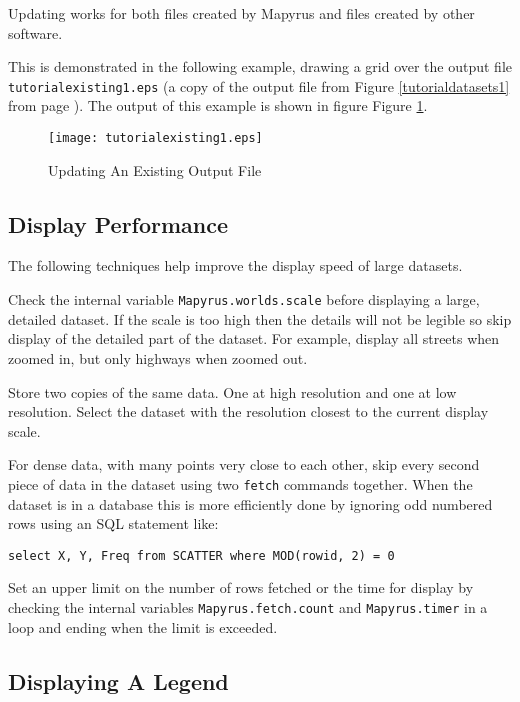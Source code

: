 Updating works for both files created by Mapyrus and files created
by other software.

This is demonstrated in the following example, drawing a grid over
the output file \texttt{tutorialexisting1.eps} (a copy of the output file
from Figure \ref{tutorialdatasets1} from page \pageref{tutorialdatasets1}).
The output of this example is shown in figure
Figure \ref{tutorialexisting1}.



\begin{figure}[htb]
\texttt{[image: tutorialexisting1.eps]}
\caption{Updating An Existing Output File}
\label{tutorialexisting1}
\end{figure}

\subsection{Display Performance}

The following techniques help improve the display speed of large datasets.

Check the internal variable \texttt{Mapyrus.worlds.scale} before displaying a
large, detailed dataset.  If the scale is too high then the details will not be
legible so skip display of the detailed part of the dataset.  For example,
display all streets when zoomed in, but only highways when zoomed out.

Store two copies of the same data.  One at high resolution and one at low
resolution.  Select the dataset with the resolution closest to the current
display scale.

For dense data, with many points very close to each other, skip every second
piece of data in the dataset using two \texttt{fetch} commands together.  When
the dataset is in a database this is more efficiently done by ignoring odd
numbered rows using an SQL statement like:

\begin{verbatim}
select X, Y, Freq from SCATTER where MOD(rowid, 2) = 0
\end{verbatim}

Set an upper limit on the number of rows fetched or the time for display by
checking the internal variables \texttt{Mapyrus.fetch.count} and
\texttt{Mapyrus.timer} in a loop and ending when the limit is exceeded.

\subsection{Displaying A Legend}

